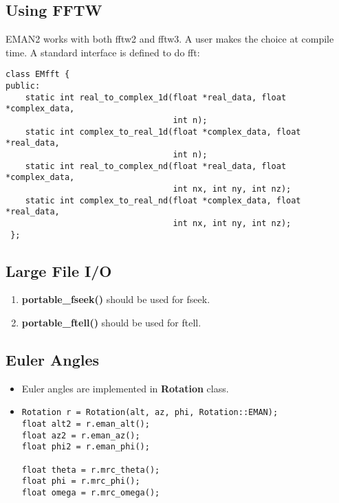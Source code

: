     \subsection{Using FFTW}  

    EMAN2 works with both fftw2 and fftw3. A user makes the choice at
    compile time.  A standard interface is defined to do fft:
    
    {
    \begin{verbatim}class EMfft {
public:
    static int real_to_complex_1d(float *real_data, float *complex_data, 
                                  int n);
    static int complex_to_real_1d(float *complex_data, float *real_data,
                                  int n);
    static int real_to_complex_nd(float *real_data, float *complex_data, 
                                  int nx, int ny, int nz);
    static int complex_to_real_nd(float *complex_data, float *real_data, 
                                  int nx, int ny, int nz);
 };\end{verbatim}
    }
 
    \subsection{Large File I/O} 
    \begin{enumerate}
      \item 
	\textbf{portable\_fseek()} should be used for fseek.
      \item
	\textbf{portable\_ftell()} should be used for ftell.
    \end{enumerate}

    \subsection{Euler Angles} 
    \begin{itemize}
      \item
	Euler angles are implemented in \textbf{Rotation} class.
      \item
	{
	\begin{verbatim}Rotation r = Rotation(alt, az, phi, Rotation::EMAN);
float alt2 = r.eman_alt();
float az2 = r.eman_az();
float phi2 = r.eman_phi();

float theta = r.mrc_theta();
float phi = r.mrc_phi();
float omega = r.mrc_omega();\end{verbatim}}
    \end{itemize}

